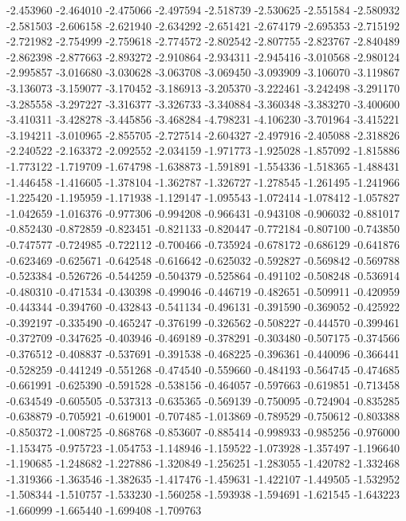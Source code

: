-2.453960
-2.464010
-2.475066
-2.497594
-2.518739
-2.530625
-2.551584
-2.580932
-2.581503
-2.606158
-2.621940
-2.634292
-2.651421
-2.674179
-2.695353
-2.715192
-2.721982
-2.754999
-2.759618
-2.774572
-2.802542
-2.807755
-2.823767
-2.840489
-2.862398
-2.877663
-2.893272
-2.910864
-2.934311
-2.945416
-3.010568
-2.980124
-2.995857
-3.016680
-3.030628
-3.063708
-3.069450
-3.093909
-3.106070
-3.119867
-3.136073
-3.159077
-3.170452
-3.186913
-3.205370
-3.222461
-3.242498
-3.291170
-3.285558
-3.297227
-3.316377
-3.326733
-3.340884
-3.360348
-3.383270
-3.400600
-3.410311
-3.428278
-3.445856
-3.468284
-4.798231
-4.106230
-3.701964
-3.415221
-3.194211
-3.010965
-2.855705
-2.727514
-2.604327
-2.497916
-2.405088
-2.318826
-2.240522
-2.163372
-2.092552
-2.034159
-1.971773
-1.925028
-1.857092
-1.815886
-1.773122
-1.719709
-1.674798
-1.638873
-1.591891
-1.554336
-1.518365
-1.488431
-1.446458
-1.416605
-1.378104
-1.362787
-1.326727
-1.278545
-1.261495
-1.241966
-1.225420
-1.195959
-1.171938
-1.129147
-1.095543
-1.072414
-1.078412
-1.057827
-1.042659
-1.016376
-0.977306
-0.994208
-0.966431
-0.943108
-0.906032
-0.881017
-0.852430
-0.872859
-0.823451
-0.821133
-0.820447
-0.772184
-0.807100
-0.743850
-0.747577
-0.724985
-0.722112
-0.700466
-0.735924
-0.678172
-0.686129
-0.641876
-0.623469
-0.625671
-0.642548
-0.616642
-0.625032
-0.592827
-0.569842
-0.569788
-0.523384
-0.526726
-0.544259
-0.504379
-0.525864
-0.491102
-0.508248
-0.536914
-0.480310
-0.471534
-0.430398
-0.499046
-0.446719
-0.482651
-0.509911
-0.420959
-0.443344
-0.394760
-0.432843
-0.541134
-0.496131
-0.391590
-0.369052
-0.425922
-0.392197
-0.335490
-0.465247
-0.376199
-0.326562
-0.508227
-0.444570
-0.399461
-0.372709
-0.347625
-0.403946
-0.469189
-0.378291
-0.303480
-0.507175
-0.374566
-0.376512
-0.408837
-0.537691
-0.391538
-0.468225
-0.396361
-0.440096
-0.366441
-0.528259
-0.441249
-0.551268
-0.474540
-0.559660
-0.484193
-0.564745
-0.474685
-0.661991
-0.625390
-0.591528
-0.538156
-0.464057
-0.597663
-0.619851
-0.713458
-0.634549
-0.605505
-0.537313
-0.635365
-0.569139
-0.750095
-0.724904
-0.835285
-0.638879
-0.705921
-0.619001
-0.707485
-1.013869
-0.789529
-0.750612
-0.803388
-0.850372
-1.008725
-0.868768
-0.853607
-0.885414
-0.998933
-0.985256
-0.976000
-1.153475
-0.975723
-1.054753
-1.148946
-1.159522
-1.073928
-1.357497
-1.196640
-1.190685
-1.248682
-1.227886
-1.320849
-1.256251
-1.283055
-1.420782
-1.332468
-1.319366
-1.363546
-1.382635
-1.417476
-1.459631
-1.422107
-1.449505
-1.532952
-1.508344
-1.510757
-1.533230
-1.560258
-1.593938
-1.594691
-1.621545
-1.643223
-1.660999
-1.665440
-1.699408
-1.709763
